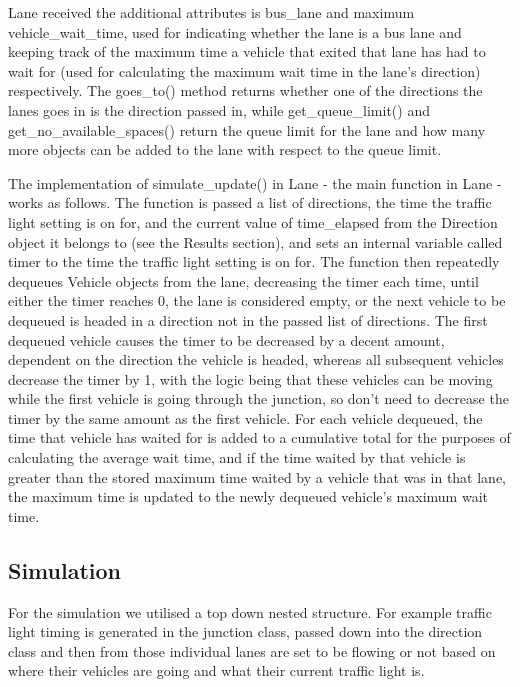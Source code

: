 \documentclass{article}
\begin{document}
    Lane received the additional attributes is bus\_lane and maximum vehicle\_wait\_time, used for indicating whether the lane is a bus lane and
    keeping track of the maximum time a vehicle that exited that lane has had to wait for (used for calculating the maximum wait time in the 
    lane’s direction) respectively. The goes\_to() method returns whether one of the directions the lanes goes in is the direction passed in,
    while get\_queue\_limit() and get\_no\_available\_spaces() return the queue limit for the lane and how many more objects can be added to the
    lane with respect to the queue limit.

    The implementation of simulate\_update() in Lane - the main function in Lane - works as follows. The function is passed a list of directions,
    the time the traffic light setting is on for, and the current value of time\_elapsed from the Direction object it belongs to (see the Results
    section), and sets an internal variable called timer to the time the traffic light setting is on for. The function then repeatedly dequeues 
    Vehicle objects from the lane, decreasing the timer each time, until either the timer reaches 0, the lane is considered empty, or the next 
    vehicle to be dequeued is headed in a direction not in the passed list of directions. The first dequeued vehicle causes the timer to be decreased 
    by a decent amount, dependent on the direction the vehicle is headed, whereas all subsequent vehicles decrease the timer by 1, with the logic 
    being that these vehicles can be moving while the first vehicle is going through the junction, so don’t need to decrease the timer by the same 
    amount as the first vehicle. For each vehicle dequeued, the time that vehicle has waited for is added to a cumulative total for the purposes of 
    calculating the average wait time, and if the time waited by that vehicle is greater than the stored maximum time waited by a vehicle that was in 
    that lane, the maximum time is updated to the newly dequeued vehicle’s maximum wait time.


    \subsection{Simulation}

    For the simulation we utilised a top down nested structure. For example traffic light timing is generated in the
    junction class, passed down into the direction class and then from those individual lanes are set to be flowing
    or not based on where their vehicles are going and what their current traffic light is.
\end{document}
